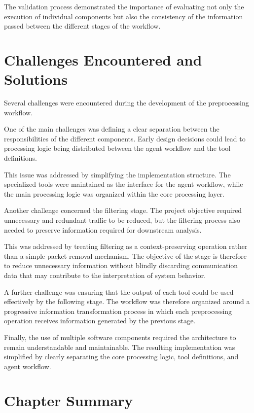 The validation process demonstrated the importance of evaluating not only the execution of individual components but also the consistency of the information passed between the different stages of the workflow.

\section{Challenges Encountered and Solutions}

Several challenges were encountered during the development of the preprocessing workflow.

One of the main challenges was defining a clear separation between the responsibilities of the different components. Early design decisions could lead to processing logic being distributed between the agent workflow and the tool definitions.

This issue was addressed by simplifying the implementation structure. The specialized tools were maintained as the interface for the agent workflow, while the main processing logic was organized within the core processing layer.

Another challenge concerned the filtering stage. The project objective required unnecessary and redundant traffic to be reduced, but the filtering process also needed to preserve information required for downstream analysis.

This was addressed by treating filtering as a context-preserving operation rather than a simple packet removal mechanism. The objective of the stage is therefore to reduce unnecessary information without blindly discarding communication data that may contribute to the interpretation of system behavior.

A further challenge was ensuring that the output of each tool could be used effectively by the following stage. The workflow was therefore organized around a progressive information transformation process in which each preprocessing operation receives information generated by the previous stage.

Finally, the use of multiple software components required the architecture to remain understandable and maintainable. The resulting implementation was simplified by clearly separating the core processing logic, tool definitions, and agent workflow.

\section{Chapter Summary}

